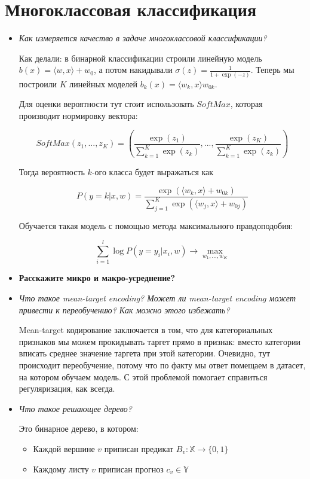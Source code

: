 \documentclass[a4paper]{article}
\begin{document}
\section*{Многоклассовая классификация}

\begin{itemize}

\item \textit{Как измеряется качество в задаче многоклассовой классификации?}

Как делали: в бинарной классификации строили линейную модель $b(x) = \langle w, x \rangle + w_0$, а потом накидывали $\sigma(z) = \frac{1}{1+\exp(-z)}$. Теперь мы построили $K$ линейных моделей $b_k(x) = \langle w_k, x \rangle w_{0k}$.

Для оценки вероятности тут стоит использовать $SoftMax$, которая производит нормировку вектора:

\[ SoftMax(z_1, ..., z_K) = \left( \frac{\exp(z_1)}{\sum_{k=1}^K \exp(z_k)}, ...,  \frac{\exp(z_K)}{\sum_{k=1}^K \exp(z_k)} \right) \]

Тогда вероятность $k$-ого класса будет выражаться как 

\[ P(y=k|x, w) = \frac{\exp(\langle w_k, x \rangle + w_{0k})}{\sum_{j=1}^K \exp( \langle w_j, x \rangle + w_{0j} )} \]

Обучается такая модель с помощью метода максимального правдоподобия:

\[  \sum_{i=1}^l \log P(y=y_i | x_i, w) \rightarrow \max_{w_1, ..., w_K} \]

\item \textbf{Расскажите микро и макро-усреднение?}

\item \textit{Что такое mean-target encoding?  Может ли mean-target encoding может привести к переобучению? Как можно этого
избежать?}

Mean-target кодирование заключается в том, что для категориальных признаков мы можем прокидывать таргет прямо в признак: вместо категории вписать среднее значение таргета при этой категории. Очевидно, тут происходит переобучение, потому что по факту мы ответ помещаем в датасет, на котором обучаем модель. С этой проблемой помогает справиться регуляризация, как всегда.

\item \textit{Что такое решающее дерево?}

Это бинарное дерево, в котором:

\begin{itemize}
\item Каждой вершине $v$ приписан предикат $B_v: \mathbb{X} \rightarrow \{ 0, 1 \}$
\item Каждому листу $v$ приписан прогноз $c_v \in \mathbb{Y}$
\end{itemize}


\end{itemize}
\end{document}
